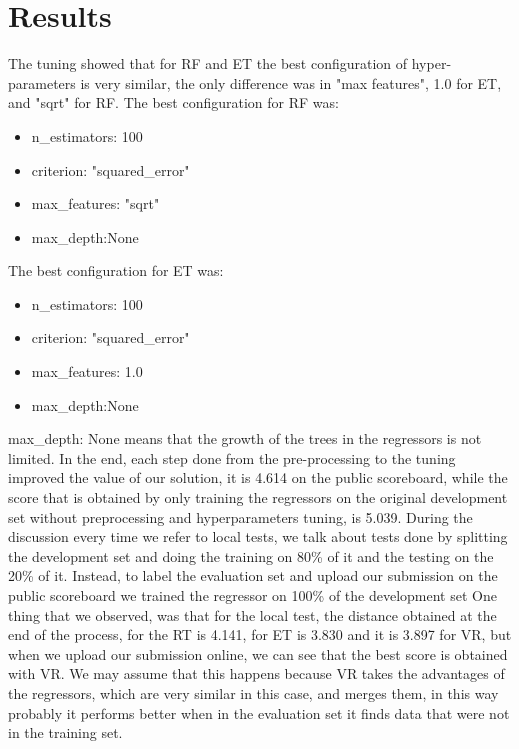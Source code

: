 \documentclass[conference]{IEEEtran}
\begin{document}
\section{Results}


The tuning showed that for RF and ET the best configuration of hyper-parameters is very similar, the only difference was in "max features", 1.0 for ET, and "sqrt" for RF.
The best configuration for RF was:

\begin{itemize}
    \item n\_estimators: 100
    \item criterion: "squared\_error"
    \item max\_features: "sqrt"
    \item max\_depth:None
\end{itemize}

The best configuration for ET was:
\begin{itemize}
    \item n\_estimators: 100
    \item criterion: "squared\_error"
    \item max\_features: 1.0
    \item max\_depth:None
\end{itemize}
max\_depth: None means that the growth of the trees in the regressors is not limited.
In the end, each step done from the pre-processing to the tuning improved the value of our solution, it is 4.614 on the public scoreboard, while the score that is obtained by only training the regressors on the original development set without preprocessing and hyperparameters tuning, is 5.039.
During the discussion every time we refer to local tests, we talk about tests done by splitting the development set and doing the training on 80\% of it and the testing on the 20\% of it. Instead, to label the evaluation set and upload our submission on the public scoreboard we trained the regressor on 100\% of the development set
One thing that we observed, was that for the local test, the distance obtained at the end of the process, for the RT is 4.141, for ET is  3.830 and it is 3.897 for VR, but when we upload our submission online, we can see that the best score is obtained with VR. We may assume that this happens because VR takes the advantages of the regressors, which are very similar in this case, and merges them, in this way probably it performs better when in the evaluation set it finds data that were not in the training set.
\end{document}
